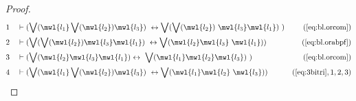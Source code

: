 \begin{proof}
\begin{align}
  1 &&  & \vdash ( \bigvee( \mwl{l_1} \bigvee( \mwl{l_2} ) \mwl{l_3} )
     ~\leftrightarrow \bigvee( \bigvee( \mwl{l_2} )
     ~\mwl{l_3} \mwl{l_1} )
     ~)&(\mbox{\ref{eq:bl.orcom}})\notag
  \\ 2 &&  & \vdash ( \bigvee( \bigvee( \mwl{l_2} ) \mwl{l_3} \mwl{l_1} )
     ~\leftrightarrow \bigvee( \mwl{l_2} \mwl{l_3}
     ~\mwl{l_1} ) )&(\mbox{\ref{eq:bl.orabpf}})\notag
  \\ 3 &&  & \vdash ( \bigvee( \mwl{l_2} \mwl{l_3} \mwl{l_1} ) \leftrightarrow
     ~\bigvee( \mwl{l_1} \mwl{l_2} \mwl{l_3} )
     ~)&(\mbox{\ref{eq:bl.orcom}})\notag
  \\ 4 &&  & \vdash ( \bigvee( \mwl{l_1} \bigvee( \mwl{l_2} ) \mwl{l_3} )
     ~\leftrightarrow \bigvee( \mwl{l_1} \mwl{l_2}
     ~\mwl{l_3} ) )&(\mbox{\ref{eq:3bitri}},1,2,3)\notag
\end{align}
\end{proof}

